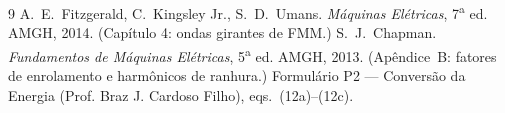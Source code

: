 \documentclass[12pt,a4paper]{article}
\begin{document}
\begin{thebibliography}{9}
 A.~E.~Fitzgerald, C.~Kingsley Jr., S.~D.~Umans. \textit{Máquinas Elétricas}, 7\textsuperscript{a} ed. AMGH, 2014. (Capítulo 4: ondas girantes de FMM.)
 S.~J.~Chapman. \textit{Fundamentos de Máquinas Elétricas}, 5\textsuperscript{a} ed. AMGH, 2013. (Apêndice~B: fatores de enrolamento e harmônicos de ranhura.)
 Formulário P2 --- Conversão da Energia (Prof. Braz J. Cardoso Filho), eqs.~(12a)--(12c).
\end{thebibliography}
\end{document}
